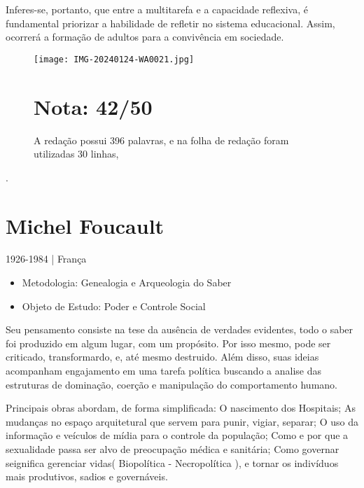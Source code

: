 \documentclass{article}
\begin{document}
Inferes-se, portanto, que entre a multitarefa e a capacidade reflexiva, é fundamental priorizar a habilidade de refletir no sistema educacional. Assim, ocorrerá a formação de adultos para a convivência em sociedade.

\begin{figure}
\centering
\texttt{[image: IMG-20240124-WA0021.jpg]}
\caption{\label{}A redação possui 396 palavras, e na folha de redação foram utilizadas 30 linhas,}

\section*{Nota: 42/50}
\end{figure}.




\maketitle
\newpage
\section*{Michel Foucault}
\begin{flushright} 1926-1984 | França \end{flushright}

\begin{itemize}
    \item Metodologia: Genealogia e Arqueologia do Saber
    \item Objeto de Estudo: Poder e Controle Social
\end{itemize}
   
    Seu pensamento consiste na tese da ausência de verdades evidentes, todo o saber foi produzido em algum lugar, com um propósito. Por isso mesmo, pode ser criticado, transformardo, e, até mesmo destruido. Além disso, suas ideias acompanham engajamento em uma tarefa política buscando a analise das estruturas de dominação, coerção e manipulação do comportamento humano.

    Principais obras abordam, de forma simplificada: O nascimento dos Hospitais; As mudanças no espaço arquitetural que servem para punir, vigiar, separar; O uso da informação e veículos de mídia para o controle da população; Como e por que a sexualidade passa ser alvo de preocupação médica e sanitária; Como governar seignifica gerenciar vidas( Biopolítica - Necropolítica ), e tornar os indivíduos mais produtivos, sadios e governáveis.
\end{document}
